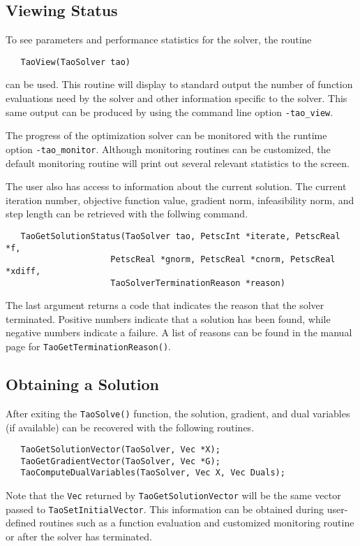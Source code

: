 \subsection{Viewing Status}

To see parameters and performance statistics for the solver, the
routine
\begin{verbatim}
   TaoView(TaoSolver tao)
\end{verbatim}
can be used.  This routine will display to standard output the number
of function evaluations need by the solver and other information
specific to the solver.  This same output can be produced by using the 
command line option {\tt -tao\_view}.

The progress of the optimization solver can be monitored with
the runtime option {\tt -tao\_monitor}.  Although monitoring routines
can be customized, the default monitoring routine will print out 
several relevant statistics to the screen.

The user also has access to information about the current solution.
The current iteration number, objective function value, gradient
norm, infeasibility norm, and step length 
can be retrieved with the follwing command.
\begin{verbatim}
   TaoGetSolutionStatus(TaoSolver tao, PetscInt *iterate, PetscReal *f,
                     PetscReal *gnorm, PetscReal *cnorm, PetscReal *xdiff,
                     TaoSolverTerminationReason *reason)
\end{verbatim}
The last argument returns a code that indicates the reason that the solver 
terminated.  Positive 
numbers indicate that a solution has been found, while negative numbers
indicate a failure.  A list of reasons can be found in the manual page
for {\tt Tao\-Get\-Termination\-Reason()}.

\subsection{Obtaining a Solution}

After exiting the {\tt Tao\-Solve()} function, the solution, gradient, and 
 dual variables (if available) can be recovered 
with the following routines.
\begin{verbatim}
   TaoGetSolutionVector(TaoSolver, Vec *X);
   TaoGetGradientVector(TaoSolver, Vec *G);
   TaoComputeDualVariables(TaoSolver, Vec X, Vec Duals);
\end{verbatim}
Note that the {\tt Vec} returned by {\tt TaoGetSolutionVector} will be
the same vector passed to {\tt TaoSetInitialVector}.  This information 
can be obtained during user-defined routines such as a function evaluation 
and customized monitoring routine or after the solver has terminated.




